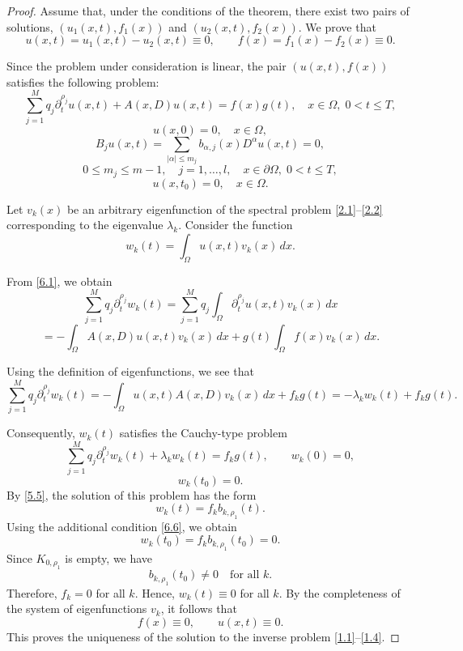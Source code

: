 \documentclass[12pt, reqno]{amsart}
\theoremstyle{definition}
\theoremstyle{remark}
\numberwithin{equation}{section}
\begin{document}
\begin{proof}
Assume that, under the conditions of the theorem, there exist two pairs of solutions,
$(u_1(x,t),f_1(x))$ and $(u_2(x,t),f_2(x))$.
We prove that
\[
u(x,t)=u_1(x,t)-u_2(x,t)\equiv 0,
\qquad
f(x)=f_1(x)-f_2(x)\equiv 0.
\]

Since the problem under consideration is linear, the pair $(u(x,t),f(x))$ satisfies the following problem:
\begin{equation}\label{6.1}
\sum_{j=1}^M q_j \partial_t^{\rho_j} u(x,t) + A(x,D)u(x,t) = f(x)g(t),
\quad x \in \Omega,\; 0 < t \le T,
\end{equation}
\begin{equation}\label{6.2}
u(x,0) = 0,
\quad x \in \Omega,
\end{equation}
\begin{equation}\label{6.3}
B_j u(x,t) = \sum_{|\alpha|\le m_j} b_{\alpha,j}(x) D^\alpha u(x,t) = 0,
\end{equation}
\[
0 \le m_j \le m-1,\quad j=1,\dots,l,\quad x \in \partial\Omega,\; 0 < t \le T,
\]
\begin{equation}\label{6.4}
u(x,t_0)=0,
\quad x \in \Omega.
\end{equation}

Let $v_k(x)$ be an arbitrary eigenfunction of the spectral problem \eqref{2.1}--\eqref{2.2}
corresponding to the eigenvalue $\lambda_k$.
Consider the function
\begin{equation}\label{6.5}
w_k(t)=\int_{\Omega} u(x,t)v_k(x)\,dx.
\end{equation}

From \eqref{6.1}, we obtain
\[
\sum_{j=1}^M q_j \partial_t^{\rho_j} w_k(t)
=
\sum_{j=1}^M q_j \int_{\Omega} \partial_t^{\rho_j} u(x,t)v_k(x)\,dx
\]
\[
=
- \int_{\Omega} A(x,D)u(x,t)v_k(x)\,dx
+ g(t)\int_{\Omega} f(x)v_k(x)\,dx.
\]

Using the definition of eigenfunctions, we see that
\[
\sum_{j=1}^M q_j \partial_t^{\rho_j} w_k(t)
=
- \int_{\Omega} u(x,t)A(x,D)v_k(x)\,dx + f_k g(t)
=
- \lambda_k w_k(t) + f_k g(t).
\]

Consequently, $w_k(t)$ satisfies the Cauchy-type problem
\[
\sum_{j=1}^M q_j \partial_t^{\rho_j} w_k(t) + \lambda_k w_k(t)
=
f_k g(t),
\qquad
w_k(0)=0,
\]
\begin{equation}\label{6.6}
w_k(t_0)=0.
\end{equation}
By \eqref{5.5}, the solution of this problem has the form
\[
w_k(t)=f_k b_{k,\rho_1}(t).
\]
Using the additional condition \eqref{6.6}, we obtain
\begin{equation}\label{6.7}
w_k(t_0)=f_k b_{k,\rho_1}(t_0)=0.
\end{equation}
Since $K_{0,\rho_1}$ is empty, we have
\[
b_{k,\rho_1}(t_0)\neq 0
\quad \text{for all } k.
\]
Therefore, $f_k=0$ for all $k$.
Hence, $w_k(t)\equiv 0$ for all $k$.
By the completeness of the system of eigenfunctions $v_k$, it follows that
\[
f(x)\equiv 0,
\qquad
u(x,t)\equiv 0.
\]
This proves the uniqueness of the solution to the inverse problem \eqref{1.1}--\eqref{1.4}.
\end{proof}
\end{document}
